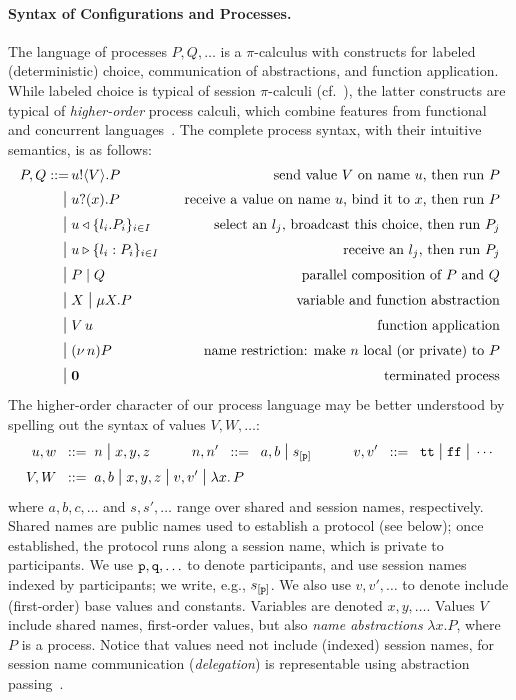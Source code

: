 \documentclass[runningheads,plain]{llncs}
\begin{document}
\paragraph{Syntax of Configurations and Processes.}
The language of processes $P, Q, \ldots$ is a $\pi$-calculus with constructs for labeled (deterministic) choice, communication of abstractions, and function application.
While labeled choice is typical of session $\pi$-calculi (cf.~\cite{DBLP:conf/esop/HondaVK98}), the latter constructs are typical of \emph{higher-order} process calculi, which combine features from functional and concurrent  languages~\cite{DBLP:journals/tcs/Sangiorgi01}. The complete process syntax, with their intuitive semantics, is  as follows:
\begin{align*}
P, Q ::= \, 
        & u ! \langle V \rangle .{P} \,\,\, \, \, &\text{send value $V$ on name $u$, then run $P$} \\
\;\mbox{\large{$\mid$}}\; & u ? (x) .{P} \,\,\, \, \, & \text{receive a value on name $u$, bind it to $x$, then run $P$} \\
\;\mbox{\large{$\mid$}}\; &  u \triangleleft \{l_i. P_i\}_{i\in I}\,\,\, \, \, & \text{select an $l_j$, broadcast this choice, then run $P_j$} \\
\;\mbox{\large{$\mid$}}\; & u \triangleright \{l_i:P_i\}_{i \in I} \,\,\, \, \, & \text{receive an   $l_j$, then run  $P_j$} \\
\;\mbox{\large{$\mid$}}\;   & P \;|\; Q  &\text{parallel composition of $P$ and $Q$} \\
\;\mbox{\large{$\mid$}}\;  & X \;\mbox{\large{$\mid$}}\;  \mu X. P \,\,\, &\text{variable and function abstraction}\\
\;\mbox{\large{$\mid$}}\; & V\, {u} \,\,\, &\text{function application} \\
\;\mbox{\large{$\mid$}}\;  & (\nu\, n)P \,\,\, &\text{name restriction: make $n$ local (or private) to $P$} \\
\;\mbox{\large{$\mid$}}\;  & \mathbf{0} \,\,\, &\text{terminated process}
\end{align*}
The higher-order character of our process language may be better understood by spelling out the syntax of values $V, W, \ldots$:
\begin{align*}
u,w  \;\;::=\;\;& n \;\mbox{\large{$\mid$}}\; x,y,z
\qquad \quad
n,n' \;\;::=\;\; a,b \;\mbox{\large{$\mid$}}\; s_{[\mathtt{p}]}
\qquad \quad
 {v},  {v}'  \;\;::=\;\;   \mathtt{tt} \;\mbox{\large{$\mid$}}\; \mathtt{ff} \;\mbox{\large{$\mid$}}\; \cdots
\\
V,W \;\;::=\;\; & {a,b} \;\mbox{\large{$\mid$}}\;  x,y,z \;\mbox{\large{$\mid$}}\;  v, v' \;\mbox{\large{$\mid$}}\; {\lambda x.\,P}
\end{align*}
\noindent 
where  $a,b,c,\ldots$ and $s,s',\ldots$ range over shared and session names, respectively.
Shared names are public names used to establish a protocol (see below); once established, the protocol runs along a session name, which is private to participants.
We   use $\mathtt{p}, \mathtt{q}, \ldots$ to denote  participants, and 
use session names indexed by participants;  we write, e.g., $s_{[\mathtt{p}]}$.
We also use $v,v',\ldots$ to denote
include  (first-order) base values and constants. Variables are denoted  $x,y, \ldots$. 
Values $V$ include shared names, 
first-order values, but also \emph{name abstractions} $\lambda x. P$, where $P$ is a process.
Notice that values need not include (indexed) session names, for session name communication (\emph{delegation}) is  representable using abstraction passing~\cite{KPY2016}.
\end{document}
